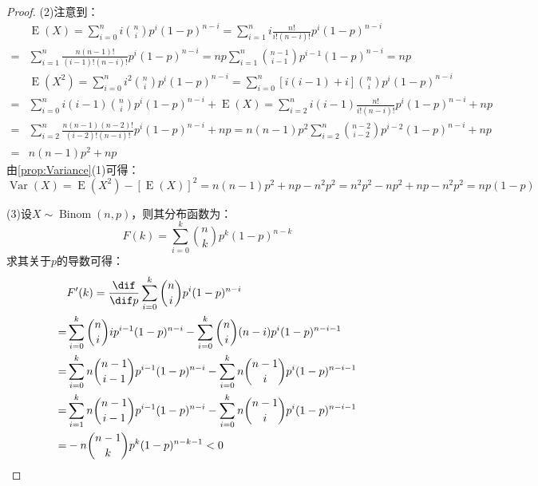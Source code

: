 \begin{proof}
	(2)注意到：
	\begin{align*}
		&\operatorname{E}(X)=\sum_{i=0}^{n}i\binom{n}{i}p^i(1-p)^{n-i}=\sum_{i=1}^{n}i\frac{n!}{i!(n-i)!}p^i(1-p)^{n-i} \\
		=&\sum_{i=1}^{n}\frac{n(n-1)!}{(i-1)!(n-i)!}p^i(1-p)^{n-i}=np\sum_{i=1}^{n}\binom{n-1}{i-1}p^{i-1}(1-p)^{n-i}=np \\
		&\operatorname{E}(X^2)=\sum_{i=0}^{n}i^2\binom{n}{i}p^i(1-p)^{n-i}=\sum_{i=0}^{n}[i(i-1)+i]\binom{n}{i}p^i(1-p)^{n-i} \\
		=&\sum_{i=0}^{n}i(i-1)\binom{n}{i}p^i(1-p)^{n-i}+\operatorname{E}(X)=\sum_{i=2}^{n}i(i-1)\frac{n!}{i!(n-i)!}p^i(1-p)^{n-i}+np \\
		=&\sum_{i=2}^{n}\frac{n(n-1)(n-2)!}{(i-2)!(n-i)!}p^i(1-p)^{n-i}+np=n(n-1)p^2\sum_{i=2}^{n}\binom{n-2}{i-2}p^{i-2}(1-p)^{n-i}+np \\
		=&n(n-1)p^2+np
	\end{align*}
	由\cref{prop:Variance}(1)可得：
	\begin{equation*}
		\operatorname{Var}(X)=\operatorname{E}(X^2)-[\operatorname{E}(X)]^2=n(n-1)p^2+np-n^2p^2=n^2p^2-np^2+np-n^2p^2=np(1-p)
	\end{equation*}\par
	(3)设$X\sim\operatorname{Binom}(n,p)$，则其分布函数为：
	\begin{equation*}
		F(k)=\sum_{i=0}^{k}\binom{n}{k}p^k(1-p)^{n-k}
	\end{equation*}
	求其关于$p$的导数可得：
	\begin{align*}
		&F'(k)=\frac{\dif}{\dif p}\sum_{i=0}^{k}\binom{n}{i}p^i(1-p)^{n-i} \\
		=&\sum_{i=0}^{k}\binom{n}{i}ip^{i-1}(1-p)^{n-i}-\sum_{i=0}^{k}\binom{n}{i}(n-i)p^i(1-p)^{n-i-1} \\
		=&\sum_{i=0}^{k}n\binom{n-1}{i-1}p^{i-1}(1-p)^{n-i}-\sum_{i=0}^{k}n\binom{n-1}{i}p^i(1-p)^{n-i-1} \\
		=&\sum_{i=1}^{k}n\binom{n-1}{i-1}p^{i-1}(1-p)^{n-i}-\sum_{i=0}^{k}n\binom{n-1}{i}p^i(1-p)^{n-i-1} \\
		=&-n\binom{n-1}{k}p^k(1-p)^{n-k-1}<0\qedhere
	\end{align*}
\end{proof}

